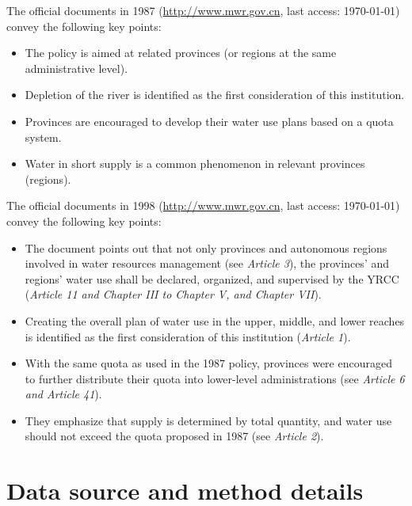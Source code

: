 \documentclass[preprint, 12pt]{elsarticle}
\begin{document}
The official documents in 1987 (\href{http://www.gov.cn/zhengce/content/2011-03/30/content_3138.htm#}{http://www.mwr.gov.cn}, last access: \today) convey the following key points:

\begin{itemize}
\item The policy is aimed at related provinces (or regions at the same administrative level).
\item Depletion of the river is identified as the first consideration of this institution.
\item Provinces are encouraged to develop their water use plans based on a quota system.
\item Water in short supply is a common phenomenon in relevant provinces (regions).
\end{itemize}

The official documents in 1998
(\href{http://www.mwr.gov.cn/ztpd/2013ztbd/2013fxkh/fxkhswcbcs/cs/flfg/201304/t20130411_433489.html}{http://www.mwr.gov.cn}, last access: \today) convey the following key points:

\begin{itemize}
\item The document points out that not only provinces and autonomous regions involved in water resources management (see \textit{Article 3}), the provinces’ and regions’ water use shall be declared, organized, and supervised by the YRCC (\textit{Article 11 and Chapter III to Chapter V, and Chapter VII}).
\item Creating the overall plan of water use in the upper, middle, and lower reaches is identified as the first consideration of this institution (\textit{Article 1}).
\item With the same quota as used in the 1987 policy, provinces were encouraged to further distribute their quota into lower-level administrations (see \textit{Article 6 and Article 41}).
\item They emphasize that supply is determined by total quantity, and water use should not exceed the quota proposed in 1987 (see \textit{Article 2}).
\end{itemize}




\newpage
\section{Data source and method details}\label{secS2}
\renewcommand{\thefigure}{B\arabic{figure}}
\renewcommand{\thetable}{B\arabic{table}}
\setcounter{figure}{0}
\setcounter{table}{0}
\end{document}
